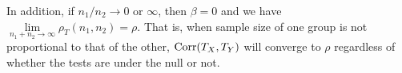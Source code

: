 In addition, if $n_1/n_2 \rightarrow 0$ or $\infty$, then $\beta = 0$ and we have $\lim\limits_{n_1 
+ n_2 \rightarrow \infty} \rho_T(n_1, n_2) = 
\rho$. That is, when sample size of one group is not proportional to that of the other, 
$\text{Corr}(T_X, T_Y)$ will converge to $\rho$ regardless of whether the tests are under the null or 
not. 	



